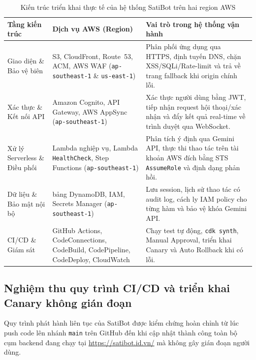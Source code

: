 \documentclass[a4paper,12pt]{article}
\newcommand{\code}[1]{\texttt{#1}}
\begin{document}
\begingroup
\setlength{\tabcolsep}{6pt}
\renewcommand{\arraystretch}{1.18}
\fontsize{10.5}{14}\selectfont
\begin{longtable}{@{}>{\raggedright\arraybackslash}p{3.6cm}>{\raggedright\arraybackslash}p{4.8cm}>{\raggedright\arraybackslash}p{\dimexpr\linewidth-8.4cm-4\tabcolsep\relax}@{}}
\caption{Kiến trúc triển khai thực tế của hệ thống SatiBot trên hai region AWS}\label{tab:deployed_architecture}\\
\toprule
\textbf{Tầng kiến trúc} & \textbf{Dịch vụ AWS (Region)} & \textbf{Vai trò trong hệ thống vận hành}\\
\midrule
\endfirsthead
\endhead
\endfoot
\bottomrule
\endlastfoot
Giao diện \& Bảo vệ biên & S3, CloudFront, Route~53, ACM, AWS WAF (\code{ap-southeast-1} \& \code{us-east-1}) & Phân phối ứng dụng qua HTTPS, định tuyến DNS, chặn XSS/SQLi/Rate-limit và trả về trang fallback khi origin chính lỗi.\\
Xác thực \& Kết nối API & Amazon Cognito, API Gateway, AWS AppSync (\code{ap-southeast-1}) & Xác thực người dùng bằng JWT, tiếp nhận request hội thoại/xác nhận và đẩy kết quả real-time về trình duyệt qua WebSocket.\\
Xử lý Serverless \& Điều phối & 5 Lambda nghiệp vụ, Lambda \code{HealthCheck}, Step Functions (\code{ap-southeast-1}) & Phân tích ý định qua Gemini API, thực thi thao tác trên tài khoản AWS đích bằng STS \code{AssumeRole} và định dạng phản hồi.\\
Dữ liệu \& Bảo mật nội bộ & 5 bảng DynamoDB, IAM, Secrets Manager (\code{ap-southeast-1}) & Lưu session, lịch sử thao tác có audit log, cách ly IAM policy cho từng hàm và bảo vệ khóa Gemini API.\\
CI/CD \& Giám sát & GitHub Actions, CodeConnections, CodeBuild, CodePipeline, CodeDeploy, CloudWatch & Chạy test tự động, \code{cdk synth}, Manual Approval, triển khai Canary và Auto Rollback khi có lỗi.\\
\end{longtable}
\endgroup

\subsection{Nghiệm thu quy trình CI/CD và triển khai Canary không gián đoạn}

Quy trình phát hành liên tục của SatiBot được kiểm chứng hoàn chỉnh từ lúc push code lên nhánh \code{main} trên GitHub đến khi cập nhật thành công toàn bộ cụm backend đang chạy tại \url{https://satibot.id.vn/} mà không gây gián đoạn người dùng.
\end{document}
